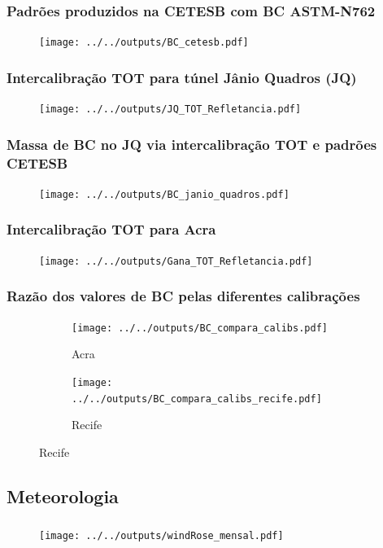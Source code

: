 \begin{frame}
  \frametitle{Padrões produzidos na CETESB com BC ASTM-N762}
  \begin{figure}[H]
  	\centering
  	\texttt{[image: ../../outputs/BC\_cetesb.pdf]}
  \end{figure}
\end{frame}

\begin{frame}
  \frametitle{Intercalibração TOT para túnel Jânio Quadros (JQ)}
  \begin{figure}[H]
    \centering
    \texttt{[image: ../../outputs/JQ\_TOT\_Refletancia.pdf]}
  \end{figure}
\end{frame}

\begin{frame}
  \frametitle{Massa de BC no JQ via intercalibração TOT e padrões CETESB}
  \begin{figure}[H]
    \centering
      \texttt{[image: ../../outputs/BC\_janio\_quadros.pdf]}
  \end{figure}
\end{frame}

\begin{frame}
  \frametitle{Intercalibração TOT para Acra}
  \begin{figure}[H]
  	\begin{center}
  		\texttt{[image: ../../outputs/Gana\_TOT\_Refletancia.pdf]}
  	\end{center}
  \end{figure}
\end{frame}

\begin{frame}
  \frametitle{Razão dos valores de BC pelas diferentes calibrações}
  \begin{figure}[H]
  	\centering
  	\begin{subfigure}[b]{0.44\linewidth}
  		\texttt{[image: ../../outputs/BC\_compara\_calibs.pdf]}
  		\caption{Acra}
  	\end{subfigure}
  		\hspace{0.3cm}
  	\begin{subfigure}[b]{0.44\linewidth}
  		\texttt{[image: ../../outputs/BC\_compara\_calibs\_recife.pdf]}
  		\caption{Recife}
  	\end{subfigure}%
   \end{figure}
\end{frame}

\subsection{Meteorologia}
\begin{frame}
	\frametitle{}
	\begin{figure}[H]
	\centering
		\texttt{[image: ../../outputs/windRose\_mensal.pdf]}
    \end{figure}
\end{frame}

